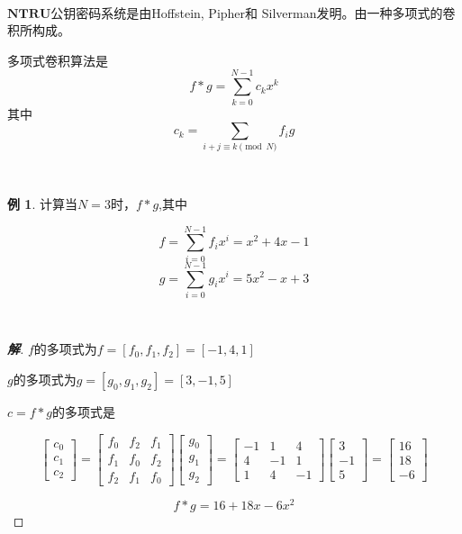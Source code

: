 \documentclass{article}
\theoremstyle{definition}
\newtheorem{example}{\indent 例}
\newenvironment{solution}{\begin{proof}[\indent\bf 解]}{\end{proof}}
\begin{document}
~\\
$\mathbf{NTRU}$公钥密码系统是由Hoffstein, Pipher和 Silverman发明。由一种多项式的卷积所构成。

多项式卷积算法是$$f * g = \sum_{k=0}^{N-1}c_kx^k$$ 其中 $$c_k = \sum_{i+j \equiv k \pmod{N}} f_ig$$

~\\

\begin{example}
计算当$N = 3$时，$f * g$,其中 

$$
f= \sum_{i=0}^{N-1} f_{i} x^{i}=x^{2}+4 x-1 
$$
$$
g =\sum_{i=0}^{N-1} g_{i} x^{i}=5 x^{2}-x+3 
$$

~\\

\begin{solution}

$f$的多项式为$f = [f_0,f_1,f_2] = [-1,4,1]$

$g$的多项式为$g = [g_0,g_1,g_2] = [3,-1,5]$

$c = f * g$的多项式是

$$
\left[\begin{array}{c}
c_{0} \\
c_{1} \\
c_{2}
\end{array}\right]=\left[\begin{array}{ccc}
f_{0} & f_{2} & f_{1} \\
f_{1} & f_{0} & f_{2} \\
f_{2} & f_{1} & f_{0}
\end{array}\right]\left[\begin{array}{c}
g_{0} \\
g_{1} \\
g_{2}
\end{array}\right]=\left[\begin{array}{ccc}
-1 & 1 & 4 \\
4 & -1 & 1 \\
1 & 4 & -1
\end{array}\right]\left[\begin{array}{c}
3 \\
-1 \\
5
\end{array}\right]=\left[\begin{array}{c}
16 \\
18 \\
-6
\end{array}\right]
$$

$$f * g = 16+18x -6x^2$$


\end{solution}
\end{example}
\end{document}
